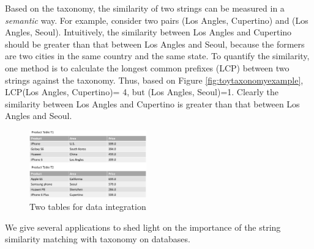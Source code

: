 Based on the taxonomy,  the similarity of two strings can be measured in a \textit{semantic} way. For example, consider two pairs (\textsf{Los Angles}, \textsf{Cupertino}) and (\textsf{Los Angles}, \textsf{Seoul}). Intuitively, the similarity between \textsf{Los Angles} and \textsf{Cupertino} should be greater than that between \textsf{Los Angles} and \textsf{Seoul}, because the formers are two cities in the same country and the same state. To quantify the similarity, one method is to calculate the longest common prefixes (LCP) between two strings against the taxonomy. Thus, based on Figure \ref{fig:toytaxonomyexample}, LCP(\textsf{Los Angles}, \textsf{Cupertino})= 4, but (\textsf{Los Angles}, \textsf{Seoul})=1. Clearly the similarity between \textsf{Los Angles} and \textsf{Cupertino} is greater than that between \textsf{Los Angles} and \textsf{Seoul}.


\begin{figure}[t]
\centering
\includegraphics[width=0.45\textwidth]{figures/productexample}
 \caption{Two tables for data integration}
\label{fig:twotables}
\end{figure}

We give several applications to shed light on the importance of the  string similarity matching with taxonomy on databases.

